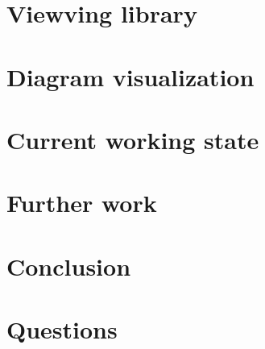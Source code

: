 \documentclass[11pt, handout]{beamer}
\begin{document}
\section{Viewving library}

\section{Diagram visualization}

\section{Current working state}

\section{Further work}

\section{Conclusion}

\section{Questions}
\end{document}
